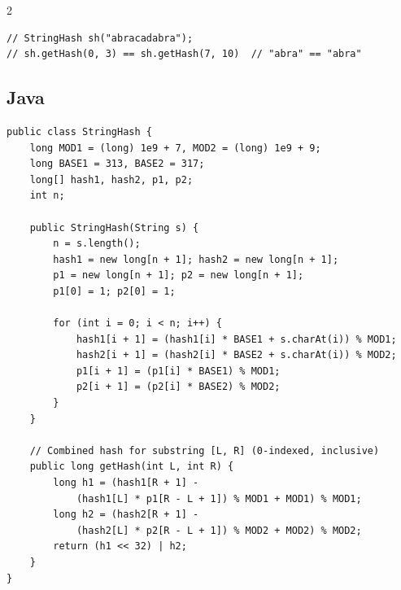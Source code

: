 \documentclass[10pt]{article}
\begin{document}
\begin{multicols}{2}
\begin{framed}
\begin{verbatim}
// StringHash sh("abracadabra");
// sh.getHash(0, 3) == sh.getHash(7, 10)  // "abra" == "abra"
\end{verbatim}
\end{framed}

\subsection{Java}
\begin{framed}
\scriptsize
\begin{verbatim}
public class StringHash {
    long MOD1 = (long) 1e9 + 7, MOD2 = (long) 1e9 + 9;
    long BASE1 = 313, BASE2 = 317;
    long[] hash1, hash2, p1, p2;
    int n;

    public StringHash(String s) {
        n = s.length();
        hash1 = new long[n + 1]; hash2 = new long[n + 1];
        p1 = new long[n + 1]; p2 = new long[n + 1];
        p1[0] = 1; p2[0] = 1;

        for (int i = 0; i < n; i++) {
            hash1[i + 1] = (hash1[i] * BASE1 + s.charAt(i)) % MOD1;
            hash2[i + 1] = (hash2[i] * BASE2 + s.charAt(i)) % MOD2;
            p1[i + 1] = (p1[i] * BASE1) % MOD1;
            p2[i + 1] = (p2[i] * BASE2) % MOD2;
        }
    }

    // Combined hash for substring [L, R] (0-indexed, inclusive)
    public long getHash(int L, int R) {
        long h1 = (hash1[R + 1] -
            (hash1[L] * p1[R - L + 1]) % MOD1 + MOD1) % MOD1;
        long h2 = (hash2[R + 1] -
            (hash2[L] * p2[R - L + 1]) % MOD2 + MOD2) % MOD2;
        return (h1 << 32) | h2;
    }
}
\end{verbatim}
\end{framed}

\end{multicols}
\newpage
\end{document}
